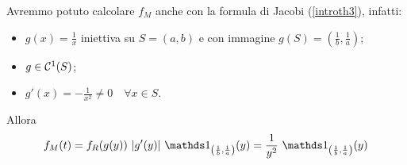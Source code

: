 \begin{enumerate}
\begin{oss} Avremmo potuto calcolare $f_M$ anche con la formula di Jacobi (\ref{introth3}), infatti:
\begin{itemize}
\item $g(x)=\frac{1}{x}$ iniettiva su $S=(a,b)$ e con immagine $g(S)=\left(\frac{1}{b},\frac{1}{a}\right)$;
\item $g\in\mathcal{C}^1(S)$;
\item $g'(x)=-\frac{1}{x^2}\neq 0\quad \forall x\in S$.
\end{itemize}
Allora
\[
f_M(t)=f_R(g(y))\ |g'(y)|\ \Ind_{\left(\frac{1}{b},\frac{1}{a}\right)}(y)=\frac{1}{y^2}\ \Ind_{\left(\frac{1}{b},\frac{1}{a}\right)}(y)
\]
\end{oss}

\end{enumerate}

